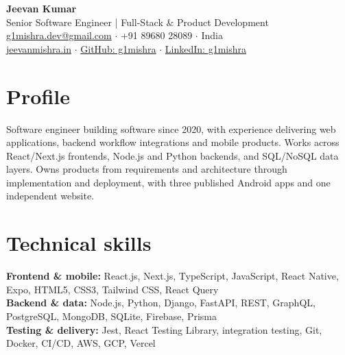 \documentclass[a4paper,10pt]{article}
\begin{document}
\begin{center}
{\LARGE\textbf{Jeevan Kumar}}\\[3pt]
Senior Software Engineer | Full-Stack \& Product Development\\[3pt]
\href{mailto:g1mishra.dev@gmail.com}{g1mishra.dev@gmail.com} $\cdot$ +91 89680 28089 $\cdot$ India\\[2pt]
\href{https://jeevanmishra.in}{jeevanmishra.in} $\cdot$ \href{https://github.com/g1mishra}{GitHub: g1mishra} $\cdot$ \href{https://linkedin.com/in/g1mishra}{LinkedIn: g1mishra}
\end{center}
\section{Profile}
Software engineer building software since 2020, with experience delivering web applications, backend workflow integrations and mobile products. Works across React/Next.js frontends, Node.js and Python backends, and SQL/NoSQL data layers. Owns products from requirements and architecture through implementation and deployment, with three published Android apps and one independent website.
\section{Technical skills}
\textbf{Frontend \& mobile:} React.js, Next.js, TypeScript, JavaScript, React Native, Expo, HTML5, CSS3, Tailwind CSS, React Query\\ \textbf{Backend \& data:} Node.js, Python, Django, FastAPI, REST, GraphQL, PostgreSQL, MongoDB, SQLite, Firebase, Prisma\\ \textbf{Testing \& delivery:} Jest, React Testing Library, integration testing, Git, Docker, CI/CD, AWS, GCP, Vercel
\end{document}
